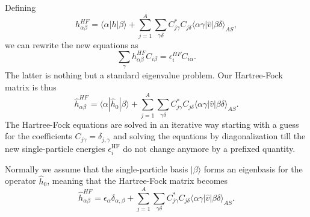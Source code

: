 Defining 
\[
h_{\alpha\beta}^{HF}=\langle \alpha | h | \beta \rangle+
\sum_{j=1}^A\sum_{\gamma\delta} C^*_{j\gamma}C_{j\delta}\langle \alpha\gamma|\hat{v}|\beta\delta\rangle_{AS},
\]
we can rewrite the new equations as 
\begin{equation}
\sum_{\gamma}h_{\alpha\beta}^{HF}C_{i\beta}=\epsilon_i^{HF}C_{i\alpha}. \label{eq:newhf}
\end{equation}
The latter is nothing but a standard eigenvalue problem. 
Our Hartree-Fock matrix is thus
\[
\hat{h}_{\alpha\beta}^{HF}=\langle \alpha | \hat{h}_0 | \beta \rangle+
\sum_{j=1}^A\sum_{\gamma\delta} C^*_{j\gamma}C_{j\delta}\langle \alpha\gamma|\hat{v}|\beta\delta\rangle_{AS}.
\]
The Hartree-Fock equations are solved in an iterative way starting
with a guess for the coefficients $C_{j\gamma}=\delta_{j,\gamma}$ and
solving the equations by diagonalization till the new single-particle
energies $\epsilon_i^{\mathrm{HF}}$ do not change anymore by a
prefixed quantity.

Normally we assume that the single-particle basis $|\beta\rangle$
forms an eigenbasis for the operator $\hat{h}_0$, meaning that the
Hartree-Fock matrix becomes
\[
\hat{h}_{\alpha\beta}^{HF}=\epsilon_{\alpha}\delta_{\alpha,\beta}+
\sum_{j=1}^A\sum_{\gamma\delta} C^*_{j\gamma}C_{j\delta}\langle \alpha\gamma|\hat{v}|\beta\delta\rangle_{AS}.
\]

